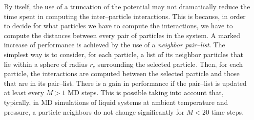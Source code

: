 By itself, the use of a truncation of the potential may not dramatically reduce the time spent in computing the
inter--particle interactions. This is because, in order to decide for what particles we have to compute the
interactions, we have to compute the distances between every pair of particles in the system. A marked increase
of performance is achieved by the use of a \textit{neighbor pair--list}. The simplest way is to consider, for
each particle, a list of its neighbor particles that lie within a sphere of radius $r_c$ surrounding the selected
particle. Then, for each particle, the interactions are computed between the selected particle and those that are
in its pair--list. There is a gain in performance if the pair--list is updated at least every $M>1$ \ac{MD}
steps. This is possible taking into account that, typically, in \ac{MD} simulations of liquid systems at ambient
temperature and pressure, a particle neighbors do not change significantly for $M < 20$ time steps.

